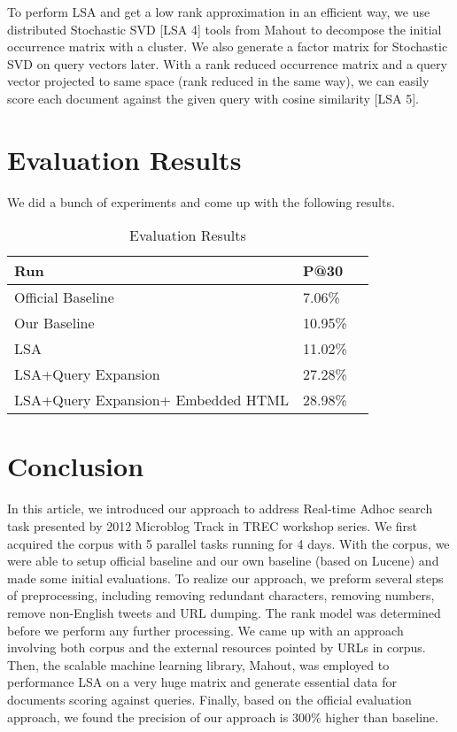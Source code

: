 \documentclass{acm_proc_article-sp}
\begin{document}
To perform LSA and get a low rank approximation in an efficient way, we use distributed Stochastic SVD [LSA 4] tools from Mahout to decompose the initial occurrence matrix with a cluster. We also generate a factor matrix for Stochastic SVD on query vectors later. With a rank reduced occurrence matrix and a query vector projected to same space (rank reduced in the same way), we can easily score each document against the given query with cosine similarity [LSA 5].

\section{Evaluation Results}
We did a bunch of experiments and come up with the following results.
\begin{table}
\centering
\caption{Evaluation Results}
\begin{tabular}{|l|l|l} \hline
Run&P@30\\ \hline
Official Baseline&7.06\%\\ \hline
Our Baseline&10.95\%\\ \hline
LSA&11.02\%\\ \hline
LSA+Query Expansion&27.28\%\\ \hline
LSA+Query Expansion+ Embedded HTML&28.98\%\\ \hline
\hline\end{tabular}
\end{table}


\section{Conclusion}
In this article, we introduced our approach to address Real-time Adhoc search task presented by 2012 Microblog Track in TREC workshop series. We first acquired the corpus with 5 parallel tasks running for 4 days. With the corpus, we were able to setup official baseline and our own baseline (based on Lucene) and made some initial evaluations. To realize our approach, we preform several steps of preprocessing, including removing redundant characters, removing numbers, remove non-English tweets and URL dumping. The rank model was determined before we perform any further processing. We came up with an approach involving both corpus and the external resources pointed by URLs in corpus. Then, the scalable machine learning library, Mahout, was employed to performance LSA on a very huge matrix and generate essential data for documents scoring against queries. Finally, based on the official evaluation approach, we found the precision of our approach is 300\% higher than baseline.
\end{document}
